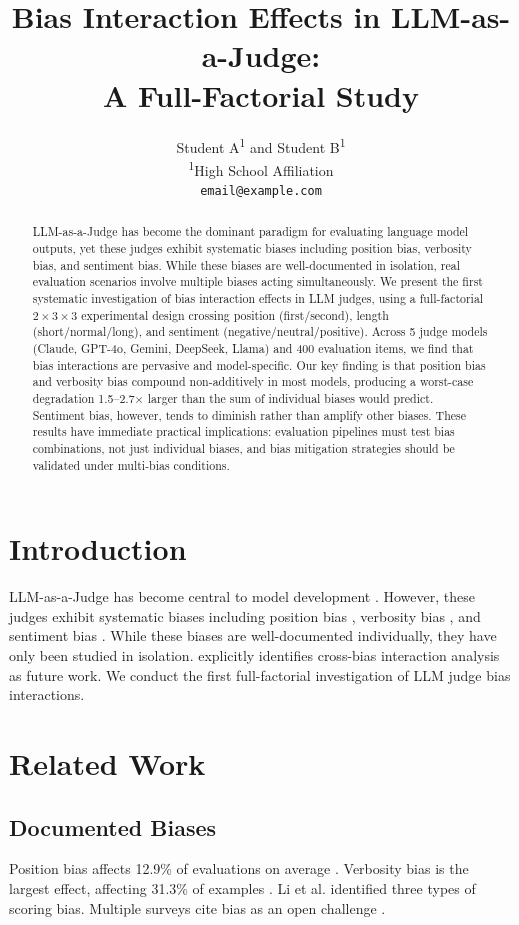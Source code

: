 \documentclass[11pt]{article}
\title{Bias Interaction Effects in LLM-as-a-Judge: \\ A Full-Factorial Study}
\author{Student A\textsuperscript{1} and Student B\textsuperscript{1} \\
\textsuperscript{1}High School Affiliation \\
\texttt{email@example.com}}
\date{}
\begin{document}
\maketitle

\begin{abstract}
LLM-as-a-Judge has become the dominant paradigm for evaluating language model outputs, yet these judges exhibit systematic biases including position bias, verbosity bias, and sentiment bias. While these biases are well-documented in isolation, real evaluation scenarios involve multiple biases acting simultaneously. We present the first systematic investigation of bias interaction effects in LLM judges, using a full-factorial $2 \times 3 \times 3$ experimental design crossing position (first/second), length (short/normal/long), and sentiment (negative/neutral/positive). Across 5 judge models (Claude, GPT-4o, Gemini, DeepSeek, Llama) and 400 evaluation items, we find that bias interactions are pervasive and model-specific. Our key finding is that position bias and verbosity bias compound non-additively in most models, producing a worst-case degradation 1.5--2.7$\times$ larger than the sum of individual biases would predict. Sentiment bias, however, tends to diminish rather than amplify other biases. These results have immediate practical implications: evaluation pipelines must test bias combinations, not just individual biases, and bias mitigation strategies should be validated under multi-bias conditions.
\end{abstract}

\section{Introduction}
LLM-as-a-Judge has become central to model development \citep{zheng2023judging}. However, these judges exhibit systematic biases including position bias \citep{shi2025position}, verbosity bias \citep{ye2024justice}, and sentiment bias \citep{soumik2026judging}. While these biases are well-documented individually, they have only been studied in isolation. \citet{soumik2026judging} explicitly identifies cross-bias interaction analysis as future work. We conduct the first full-factorial investigation of LLM judge bias interactions.

\section{Related Work}
\subsection{Documented Biases}
Position bias affects 12.9\% of evaluations on average \citep{shi2025position}. Verbosity bias is the largest effect, affecting 31.3\% of examples \citep{soumik2026judging}. Li et al. \citep{li2025scoring} identified three types of scoring bias. Multiple surveys cite bias as an open challenge \citep{gu2024survey,li2024llmsjudges}.
\end{document}
